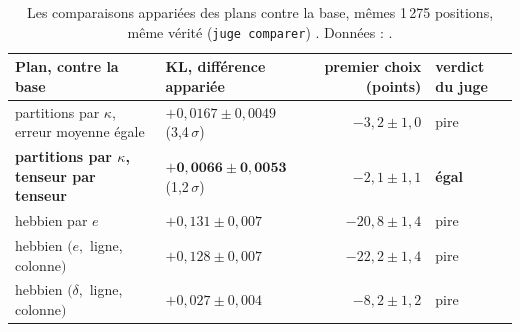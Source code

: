 \begin{table}[tbp]
\centering\footnotesize\setlength{\tabcolsep}{3pt}
\begin{tabularx}{\linewidth}{@{}>{\raggedright\arraybackslash}X l r l@{}}
\toprule
Plan, contre la base & KL, différence appariée & premier choix (points) & verdict du juge \\
\midrule
partitions par $\kappa$, erreur moyenne égale & $+0{,}0167 \pm 0{,}0049$ (3,4\,$\sigma$) & $-3{,}2 \pm 1{,}0$ & pire \\
\textbf{partitions par $\kappa$, tenseur par tenseur} & $\mathbf{+0{,}0066 \pm 0{,}0053}$ (1,2\,$\sigma$) & $-2{,}1 \pm 1{,}1$ & \textbf{égal} \\
hebbien par $e$ & $+0{,}131 \pm 0{,}007$ & $-20{,}8 \pm 1{,}4$ & pire \\
hebbien $(e,$ ligne, colonne$)$ & $+0{,}128 \pm 0{,}007$ & $-22{,}2 \pm 1{,}4$ & pire \\
hebbien $(\delta,$ ligne, colonne$)$ & $+0{,}027 \pm 0{,}004$ & $-8{,}2 \pm 1{,}2$ & pire \\
\bottomrule
\end{tabularx}
\caption[Les comparaisons appariées des plans]{Les comparaisons appariées des plans contre la base, mêmes 1\,275 positions, même vérité (\texttt{juge comparer}) \mes. Données : .}
\label{t3pre:tab:apparie}
\end{table}

